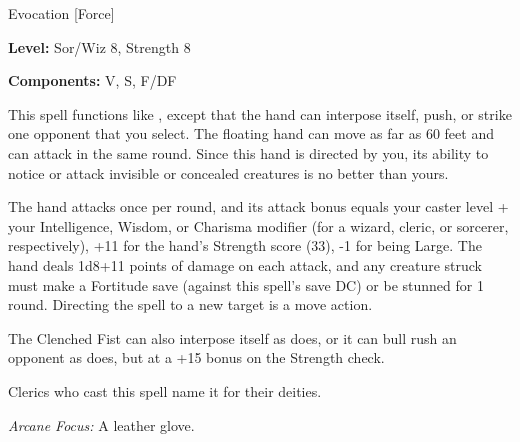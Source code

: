 
Evocation [Force]

\textbf{Level:} Sor/Wiz 8, Strength 8

\textbf{Components:} V, S, F/DF

This spell functions like , except that the hand can interpose 
itself, push, or strike one opponent that you select. The floating hand can move 
as far as 60 feet and can attack in the same round. Since this hand is directed 
by you, its ability to notice or attack invisible or concealed creatures is no 
better than yours.

The hand attacks once per round, and its attack bonus equals your caster level 
+ your Intelligence, Wisdom, or Charisma modifier (for a wizard, cleric, or sorcerer, 
respectively), +11 for the hand's Strength score (33), -1 for being Large. The 
hand deals 1d8+11 points of damage on each attack, and any creature struck must 
make a Fortitude save (against this spell's save DC) or be stunned for 1 round. 
Directing the spell to a new target is a move action.

The Clenched Fist can also interpose itself as 
does, or it can bull rush an opponent as  does, but at a 
+15 bonus on the Strength check.

Clerics who cast this spell name it for their deities.

\textit{Arcane Focus:} A leather glove.

